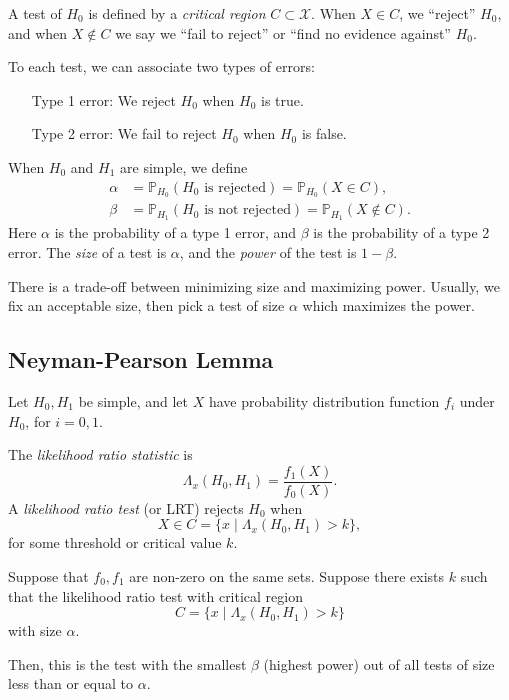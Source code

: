 \documentclass[12pt]{article}
\begin{document}
A test of $H_0$ is defined by a \emph{critical region} $C \subset \mathcal{X}$. When  $X \in C$, we ``reject'' $H_0$, and when $X \not \in C$ we say we ``fail to reject'' or ``find no evidence against'' $H_0$.

To each test, we can associate two types of errors:
\begin{itemize}
	\item[Type 1 error:] We reject $H_0$ when $H_0$ is true.
	\item[Type 2 error:] We fail to reject $H_0$ when $H_0$ is false.
\end{itemize}

When $H_0$ and $H_1$ are simple, we define
\begin{align*}
	\alpha &= \mathbb{P}_{H_0}(H_0 \text{ is rejected}) = \mathbb{P}_{H_0}(X \in C), \\
	\beta &= \mathbb{P}_{H_1}(H_0 \text{ is not rejected}) = \mathbb{P}_{H_1}(X \not \in C).
\end{align*}
Here $\alpha$ is the probability of a type 1 error, and $\beta$ is the probability of a type 2 error. The \emph{size} of a test is $\alpha$, and the \emph{power} of the test is $1 - \beta$.

There is a trade-off between minimizing size and maximizing power. Usually, we fix an acceptable size, then pick a test of size $\alpha$ which maximizes the power.

\subsection{Neyman-Pearson Lemma}
\label{sub:neyman_pearson_lemma}

Let $H_0, H_1$ be simple, and let $X$ have probability distribution function $f_i$ under $H_0$, for $i = 0, 1$.

The \emph{likelihood ratio statistic} is
\[
\Lambda_x (H_0, H_1) = \frac{f_1(X)}{f_0(X)}
.\]
A \emph{likelihood ratio test} (or LRT) rejects $H_0$ when
\[
	X \in C = \{x \mid \Lambda_x(H_0, H_1) > k\}
,\]
for some threshold or critical value $k$.

\begin{theorem}
	Suppose that $f_0, f_1$ are non-zero on the same sets. Suppose there exists $k$ such that the likelihood ratio test with critical region
	\[
		C = \{x \mid \Lambda_x(H_0, H_1) > k\}
	\]
	with size $\alpha$.

	Then, this is the test with the smallest $\beta$ (highest power) out of all tests of size less than or equal to $\alpha$.
\end{theorem}
\end{document}
